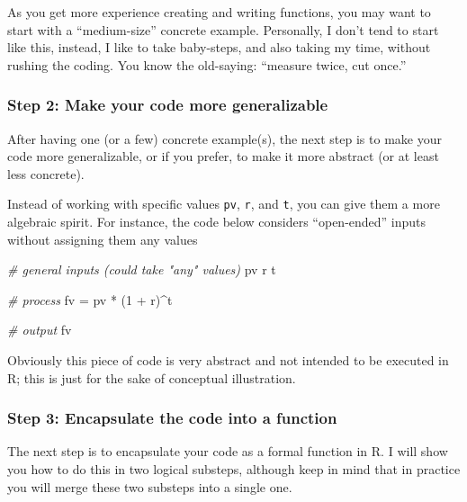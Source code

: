 \documentclass[
]{book}
\newenvironment{Shaded}{\begin{snugshade}}{\end{snugshade}}
\newcommand{\CommentTok}[1]{\textcolor[rgb]{0.56,0.35,0.01}{\textit{#1}}}
\newcommand{\DecValTok}[1]{\textcolor[rgb]{0.00,0.00,0.81}{#1}}
\newcommand{\NormalTok}[1]{#1}
\newcommand{\OtherTok}[1]{\textcolor[rgb]{0.56,0.35,0.01}{#1}}
\newcommand{\SpecialCharTok}[1]{\textcolor[rgb]{0.00,0.00,0.00}{#1}}
\begin{document}
As you get more experience creating and writing functions, you may want to
start with a ``medium-size'' concrete example. Personally, I don't tend to start
like this, instead, I like to take baby-steps, and also taking my time, without
rushing the coding. You know the old-saying: ``measure twice, cut once.''

\hypertarget{step-2-make-your-code-more-generalizable}{%
\subsubsection*{Step 2: Make your code more generalizable}\label{step-2-make-your-code-more-generalizable}}

After having one (or a few) concrete example(s), the next step is to make your
code more generalizable, or if you prefer, to make it more abstract (or at
least less concrete).

Instead of working with specific values \texttt{pv}, \texttt{r}, and \texttt{t}, you can give them
a more algebraic spirit. For instance, the code below considers ``open-ended''
inputs without assigning them any values

\begin{Shaded}
\begin{Highlighting}[]
\CommentTok{\# general inputs (could take "any" values)}
\NormalTok{pv}
\NormalTok{r}
\NormalTok{t}

\CommentTok{\# process}
\NormalTok{fv }\OtherTok{=}\NormalTok{ pv }\SpecialCharTok{*}\NormalTok{ (}\DecValTok{1} \SpecialCharTok{+}\NormalTok{ r)}\SpecialCharTok{\^{}}\NormalTok{t}

\CommentTok{\# output}
\NormalTok{fv}
\end{Highlighting}
\end{Shaded}

Obviously this piece of code is very abstract and not intended to be executed
in R; this is just for the sake of conceptual illustration.

\hypertarget{step-3-encapsulate-the-code-into-a-function}{%
\subsubsection*{Step 3: Encapsulate the code into a function}\label{step-3-encapsulate-the-code-into-a-function}}

The next step is to encapsulate your code as a formal function in R. I will
show you how to do this in two logical substeps, although keep in mind that in
practice you will merge these two substeps into a single one.
\end{document}
